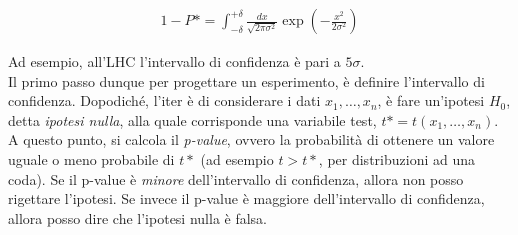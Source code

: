 \documentclass{report}
\begin{document}
\begin{align}
    1 - P* = \int_{-\delta}^{+\delta} \frac{dx}{\sqrt{2\pi\sigma^2}}\exp\left(-\frac{x^2}{2\sigma^2}\right)
\end{align}

Ad esempio, all'LHC l'intervallo di confidenza è pari a \(5\sigma\). \\

Il primo passo dunque per progettare un esperimento, è definire l'intervallo di confidenza. Dopodiché, l'iter è di considerare i dati \(x_1, \ldots, x_n\), è fare un'ipotesi \(H_0\), detta \emph{ipotesi nulla}, alla quale corrisponde una variabile test, \(t* = t(x_1, \ldots, x_n)\). \\

A questo punto, si calcola il \emph{p-value}, ovvero la probabilità di ottenere un valore uguale o meno probabile di \(t*\) (ad esempio \(t >t*\), per distribuzioni ad una coda). Se il p-value è \emph{minore} dell'intervallo di confidenza, allora non posso rigettare l'ipotesi. Se invece il p-value è maggiore dell'intervallo di confidenza, allora posso dire che l'ipotesi nulla è falsa. 


\end{document}
